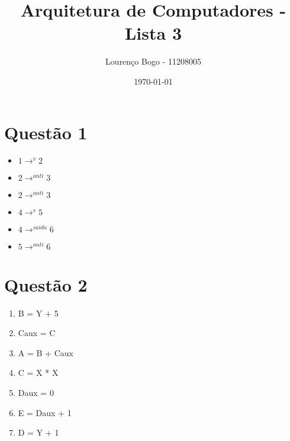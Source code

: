 \documentclass[11pt]{article}
\author{Lourenço Bogo - 11208005}
\date{\today}
\title{Arquitetura de Computadores - Lista 3}
\begin{document}
\maketitle

\section{Questão 1}
\label{sec:orgcaa6e91}
\begin{itemize}
\item \(1 \rightarrow^{v} 2\)
\item \(2 \rightarrow^{anti} 3\)
\item \(2 \rightarrow^{anti} 3\)
\item \(4 \rightarrow^{v} 5\)
\item \(4 \rightarrow^{saida} 6\)
\item \(5 \rightarrow^{anti} 6\)
\end{itemize}

\section{Questão 2}
\label{sec:org79e106e}
\begin{enumerate}
\item B = Y + 5
\item Caux = C
\item A = B + Caux
\item C = X * X
\item Daux = 0
\item E = Daux + 1
\item D = Y + 1
\end{enumerate}
\end{document}
